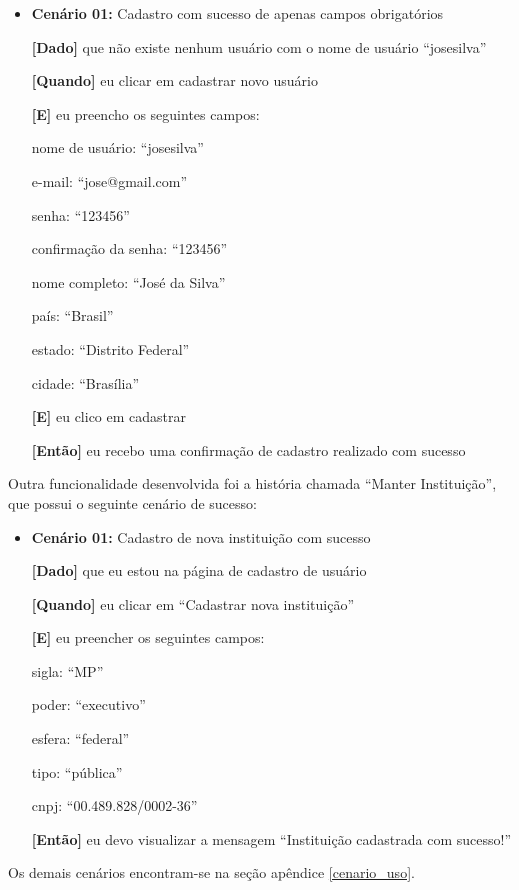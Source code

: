 	\begin{itemize}
	\item\textbf{Cenário 01:} Cadastro com sucesso de apenas campos obrigatórios

	\textbf{[Dado]} que não existe nenhum usuário com o nome de usuário ``josesilva''

	\textbf{[Quando]} eu clicar em cadastrar novo usuário

	\textbf{[E]} eu preencho os seguintes campos: 

  		\subitem nome de usuário: ``josesilva''

  		\subitem e-mail: ``jose@gmail.com''

  		\subitem senha: ``123456''

  		\subitem confirmação da senha: ``123456''

  		\subitem nome completo: ``José da Silva''

  		\subitem país: ``Brasil''

  		\subitem estado: ``Distrito Federal''

  		\subitem cidade: ``Brasília''

	\textbf{[E]} eu clico em cadastrar

	\textbf{[Então]} eu recebo uma confirmação de cadastro realizado com sucesso
	\end{itemize}
Outra funcionalidade desenvolvida foi a história chamada ``Manter Instituição'', que possui o seguinte cenário de sucesso:

\begin{itemize}
\item\textbf{Cenário 01:} Cadastro de nova instituição com sucesso

\textbf{[Dado]} que eu estou na página de cadastro de usuário

\textbf{[Quando]} eu clicar em ``Cadastrar nova instituição''

\textbf{[E]} eu preencher os seguintes campos:

  	\subitem sigla: ``MP''

  	\subitem poder: ``executivo''

  	\subitem esfera: ``federal''

  	\subitem tipo: ``pública''

  	\subitem cnpj: ``00.489.828/0002-36''

\textbf{[Então]} eu devo visualizar a mensagem ``Instituição cadastrada com sucesso!''
\end{itemize}
Os demais cenários encontram-se na seção apêndice \ref{cenario_uso}. 

